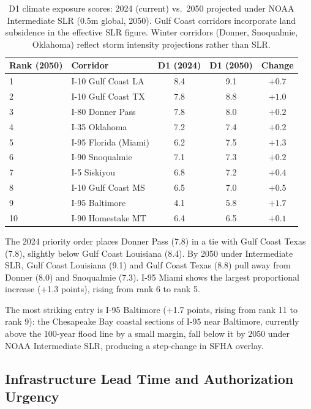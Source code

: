 \begin{table}[ht]
\centering
\caption{D1 climate exposure scores: 2024 (current) vs.\ 2050 projected under NOAA
Intermediate SLR (0.5m global, 2050). Gulf Coast corridors incorporate land subsidence
in the effective SLR figure. Winter corridors (Donner, Snoqualmie, Oklahoma) reflect
storm intensity projections rather than SLR.}
\label{tab:2050-projections}
\begin{tabular}{@{}llccc@{}}
\toprule
Rank (2050) & Corridor & D1 (2024) & D1 (2050) & Change \\
\midrule
1 & I-10 Gulf Coast LA  & 8.4 & 9.1 & $+0.7$ \\
2 & I-10 Gulf Coast TX  & 7.8 & 8.8 & $+1.0$ \\
3 & I-80 Donner Pass    & 7.8 & 8.0 & $+0.2$ \\
4 & I-35 Oklahoma       & 7.2 & 7.4 & $+0.2$ \\
5 & I-95 Florida (Miami)& 6.2 & 7.5 & $+1.3$ \\
6 & I-90 Snoqualmie     & 7.1 & 7.3 & $+0.2$ \\
7 & I-5 Siskiyou        & 6.8 & 7.2 & $+0.4$ \\
8 & I-10 Gulf Coast MS  & 6.5 & 7.0 & $+0.5$ \\
9 & I-95 Baltimore      & 4.1 & 5.8 & $+1.7$ \\
10 & I-90 Homestake MT  & 6.4 & 6.5 & $+0.1$ \\
\bottomrule
\end{tabular}
\end{table}

The 2024 priority order places Donner Pass (7.8) in a tie with Gulf Coast Texas (7.8),
slightly below Gulf Coast Louisiana (8.4). By 2050 under Intermediate SLR, Gulf Coast
Louisiana (9.1) and Gulf Coast Texas (8.8) pull away from Donner (8.0) and Snoqualmie
(7.3). I-95 Miami shows the largest proportional increase (+1.3 points), rising from
rank 6 to rank 5.

The most striking entry is I-95 Baltimore (+1.7 points, rising from rank 11 to rank 9):
the Chesapeake Bay coastal sections of I-95 near Baltimore, currently above the 100-year
flood line by a small margin, fall below it by 2050 under NOAA Intermediate SLR, producing
a step-change in SFHA overlay.

\subsection{Infrastructure Lead Time and Authorization Urgency}

